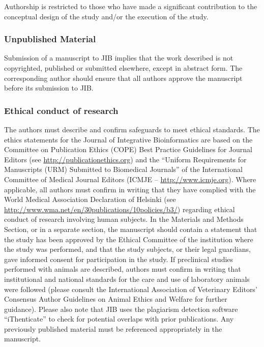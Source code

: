\documentclass{jib}
\begin{document}
Authorship is restricted to those who have made a significant contribution to
the conceptual design of the study and/or the execution of the study.


\subsubsection{Unpublished Material} 

Submission of a manuscript to JIB implies that the work described is not
copyrighted, published or submitted elsewhere, except in abstract form. The
corresponding author should ensure that all authors approve the manuscript
before its submission to JIB.


\subsubsection{Ethical conduct of research} 

The authors must describe and confirm safeguards to meet ethical standards. The
ethics statements for the Journal of Integrative Bioinformatics are based on the
Committee on Publication Ethics (COPE) Best Practice Guidelines for Journal
Editors (see \url{http://publicationethics.org}) and the ``Uniform Requirements
for Manuscripts (URM) Submitted to Biomedical Journals'' of the International
Committee of Medical Journal Editors (ICMJE – \url{http://www.icmje.org}).
Where applicable, all authors must confirm in writing that they have complied
with the World Medical Association Declaration of Helsinki (see
\url{http://www.wma.net/en/30publications/10policies/b3/}) regarding ethical
conduct of research involving human subjects. In the Materials and Methods
Section, or in a separate section, the manuscript should contain a statement
that the study has been approved by the Ethical Committee of the institution
where the study was performed, and that the study subjects, or their legal
guardians, gave informed consent for participation in the study. If preclinical
studies performed with animals are described, authors must confirm in writing
that institutional and national standards for the care and use of laboratory
animals were followed (please consult the International Association of
Veterinary Editors' Consensus Author Guidelines on Animal Ethics and Welfare for
further guidance).
Please also note that JIB uses the plagiarism detection software “iThenticate”
to check for potential overlaps with prior publications. Any previously
published material must be referenced appropriately in the manuscript.
\end{document}
